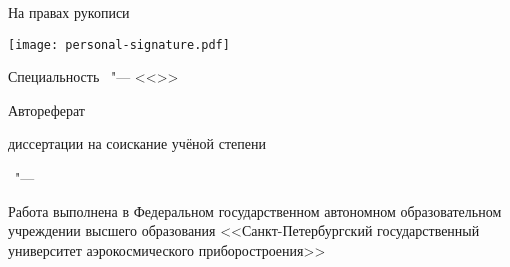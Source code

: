 \thispagestyle{empty}

\vspace{0pt plus1fill} %
\begin{flushright}
  На правах рукописи\par
  \texttt{[image: personal-signature.pdf]}
\end{flushright}

\vspace{0pt plus2fill} %
\begin{center}
 \thesisAuthor
\end{center}

\vspace{0pt plus2fill} %
\begin{center}
\textbf { \thesisTitle}

\vspace{0pt plus3fill} %
{ Специальность \thesisSpecialtyNumber\ "--- <<\thesisSpecialtyTitle>>}

\vspace{0pt plus1.5fill} %
Автореферат\par
диссертации на соискание учёной степени\par \thesisDegree
\end{center}

\vspace{0pt plus4fill} %
\begin{center}
{\thesisCity\ "--- \thesisYear}
\end{center}

\newpage
\thispagestyle{empty}
\noindent Работа выполнена в Федеральном государственном автономном образовательном учреждении высшего образования <<Санкт-Петербургский государственный университет аэрокосмического приборостроения>>


